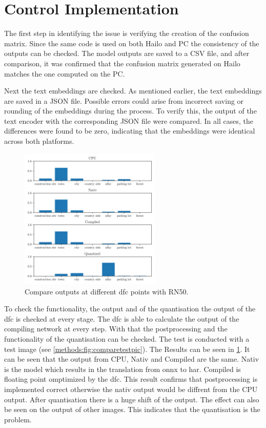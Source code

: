 \section{Control Implementation
    \label{scetion:methods:contimp}}

The first step in identifying the issue is verifying the creation of the confusion matrix.
Since the same code is used on both Hailo and PC the consistency of the outputs can be checked.
The model outputs are saved to a CSV file, and after comparison, it was confirmed that the confusion matrix generated on Hailo matches the one computed on the PC.

Next the text embeddings are checked.
As mentioned earlier, the text embeddings are saved in a JSON file.
Possible errors could arise from incorrect saving or rounding of the embeddings during the process.
To verify this, the output of the text encoder with the corresponding JSON file were compared.
In all cases, the differences were found to be zero, indicating that the embeddings were identical across both platforms.

\begin{figure}[h]
    \centering
    \includegraphics[width=0.6\textwidth]{Images/Implementation/compareProbs_RN50.png}
    \caption{Compare outputs at different \acrshort{dfc} points with RN50.}
    \label{methods:fig:comparern50}
\end{figure}

To check the functionality, the output and of the quantisation the output of the \acrshort{dfc} is checked at every stage.
The \acrshort{dfc} is able to calculate the output of the compiling network at every step.
With that the postprocessing and the functionality of the quantisation can be checked.
The test is conducted with a test image (see \cref{methods:fig:comparetestpic}).
The Results can be seen in \cref{methods:fig:comparern50}.
It can be seen that the output from CPU, Nativ and Compiled are the same.
Nativ is the model which results in the translation from onnx to \acrshort{har}.
Compiled is floating point omptimized by the \acrshort{dfc}.
This result confirms that postprocessing is implemented correct otherwise the nativ output would be diffrent from the CPU output.
After quantisation there is a huge shift of the output.
The effect can also be seen on the output of other images.
This indicates that the quantisation is the problem.

